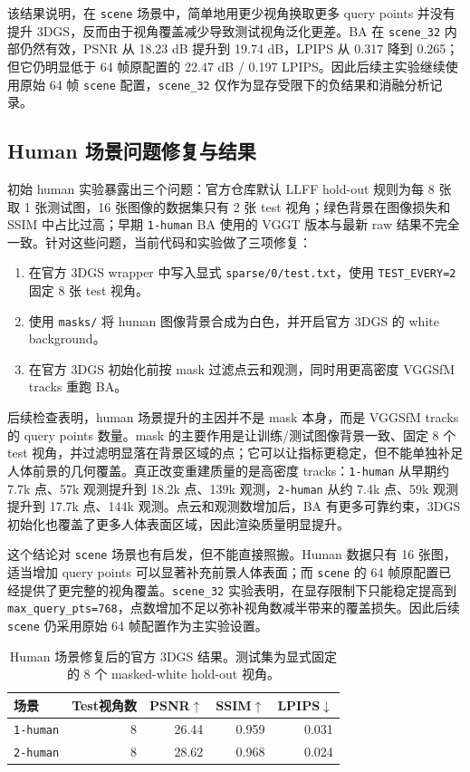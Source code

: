 \documentclass[UTF8,a4paper,11pt]{ctexart}
\begin{document}
该结果说明，在 \texttt{scene} 场景中，简单地用更少视角换取更多 query points 并没有提升 3DGS，反而由于视角覆盖减少导致测试视角泛化更差。BA 在 \texttt{scene\_32} 内部仍然有效，PSNR 从 18.23 dB 提升到 19.74 dB，LPIPS 从 0.317 降到 0.265；但它仍明显低于 64 帧原配置的 22.47 dB / 0.197 LPIPS。因此后续主实验继续使用原始 64 帧 \texttt{scene} 配置，\texttt{scene\_32} 仅作为显存受限下的负结果和消融分析记录。

\subsection{Human 场景问题修复与结果}

初始 human 实验暴露出三个问题：官方仓库默认 LLFF hold-out 规则为每 8 张取 1 张测试图，16 张图像的数据集只有 2 张 test 视角；绿色背景在图像损失和 SSIM 中占比过高；早期 \texttt{1-human} BA 使用的 VGGT 版本与最新 raw 结果不完全一致。针对这些问题，当前代码和实验做了三项修复：

\begin{enumerate}[leftmargin=2em]
    \item 在官方 3DGS wrapper 中写入显式 \texttt{sparse/0/test.txt}，使用 \texttt{TEST\_EVERY=2} 固定 8 张 test 视角。
    \item 使用 \texttt{masks/} 将 human 图像背景合成为白色，并开启官方 3DGS 的 white background。
    \item 在官方 3DGS 初始化前按 mask 过滤点云和观测，同时用更高密度 VGGSfM tracks 重跑 BA。
\end{enumerate}

后续检查表明，human 场景提升的主因并不是 mask 本身，而是 VGGSfM tracks 的 query points 数量。mask 的主要作用是让训练/测试图像背景一致、固定 8 个 test 视角，并过滤明显落在背景区域的点；它可以让指标更稳定，但不能单独补足人体前景的几何覆盖。真正改变重建质量的是高密度 tracks：\texttt{1-human} 从早期约 7.7k 点、57k 观测提升到 18.2k 点、139k 观测，\texttt{2-human} 从约 7.4k 点、59k 观测提升到 17.7k 点、144k 观测。点云和观测数增加后，BA 有更多可靠约束，3DGS 初始化也覆盖了更多人体表面区域，因此渲染质量明显提升。

这个结论对 \texttt{scene} 场景也有启发，但不能直接照搬。Human 数据只有 16 张图，适当增加 query points 可以显著补充前景人体表面；而 \texttt{scene} 的 64 帧原配置已经提供了更完整的视角覆盖。\texttt{scene\_32} 实验表明，在显存限制下只能稳定提高到 \texttt{max\_query\_pts=768}，点数增加不足以弥补视角数减半带来的覆盖损失。因此后续 \texttt{scene} 仍采用原始 64 帧配置作为主实验设置。

\begin{table}[H]
\centering
\caption{Human 场景修复后的官方 3DGS 结果。测试集为显式固定的 8 个 masked-white hold-out 视角。}
\label{tab:human-gs}
\begin{tabular}{lrrrr}
\toprule
场景 & Test视角数 & PSNR$\uparrow$ & SSIM$\uparrow$ & LPIPS$\downarrow$ \\
\midrule
\texttt{1-human} & 8 & 26.44 & 0.959 & 0.031 \\
\texttt{2-human} & 8 & 28.62 & 0.968 & 0.024 \\
\bottomrule
\end{tabular}
\end{table}
\end{document}
